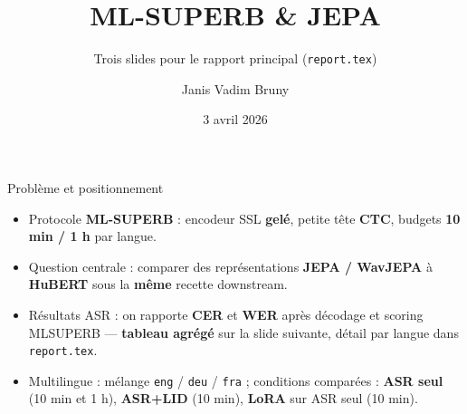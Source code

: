 \documentclass[aspectratio=169]{beamer}
\title{ML-SUPERB \& JEPA}
\subtitle{Trois slides pour le rapport principal (\texttt{report.tex})}
\author{Janis Vadim Bruny}
\date{3 avril 2026}
\begin{document}
\begin{frame}
\titlepage
\end{frame}

\begin{frame}{Problème et positionnement}
\begin{itemize}
\item Protocole \textbf{ML-SUPERB} : encodeur SSL \textbf{gelé}, petite tête \textbf{CTC}, budgets \textbf{10 min / 1 h} par langue.
\item Question centrale : comparer des représentations \textbf{JEPA / WavJEPA} à \textbf{HuBERT} sous la \textbf{même} recette downstream.
\item Résultats ASR : on rapporte \textbf{CER} et \textbf{WER} après décodage et scoring MLSUPERB — \textbf{tableau agrégé} sur la slide suivante, détail par langue dans \texttt{report.tex}.
\item Multilingue : mélange \texttt{eng} / \texttt{deu} / \texttt{fra} ; conditions comparées : \textbf{ASR seul} (10 min et 1 h), \textbf{ASR+LID} (10 min), \textbf{LoRA} sur ASR seul (10 min).
\end{itemize}
\end{frame}
\end{document}
